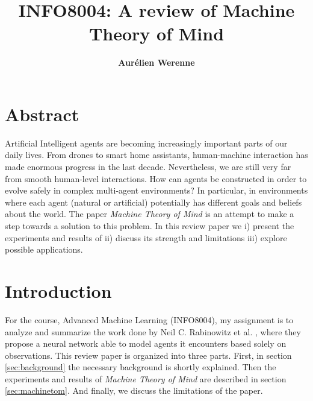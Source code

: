 \documentclass[twocolumn,superscriptaddress,aps]{revtex4-1}
\begin{document}

\title{\Large{INFO8004: A review of Machine Theory of Mind}}
\vspace{1cm}
\author{\small{\bf Aurélien Werenne}}

\maketitle



\section*{Abstract}
\begin{changemargin}{0.55cm}{0.55cm} 
Artificial Intelligent agents are becoming increasingly important parts of our daily lives. From drones to smart home assistants, human-machine interaction has made enormous progress in the last decade. Nevertheless, we are still very far from smooth human-level interactions. How can agents be constructed in order to evolve safely in complex multi-agent environments? In particular, in environments where each agent (natural or artificial) potentially has different goals and beliefs about the world. The paper \textit{Machine Theory of Mind} \cite{Tomnet} is an attempt to make a step towards a solution to this problem. In this review paper we i) present the experiments and results of \cite{Tomnet} ii) discuss its strength and limitations iii) explore possible applications.
\end{changemargin} 

\section{Introduction}

\noindent For the course, Advanced Machine Learning (INFO8004), my assignment is to analyze and summarize the work done by Neil C. Rabinowitz et al. \cite{Tomnet}, where they propose a neural network able to model agents it encounters based solely on observations. This review paper is organized into three parts. First, in section \ref{sec:background} the necessary background is shortly explained. Then the experiments and results of \textit{Machine Theory of Mind} are described in section \ref{sec:machinetom}. And finally, we discuss the limitations of the paper.
\end{document}
